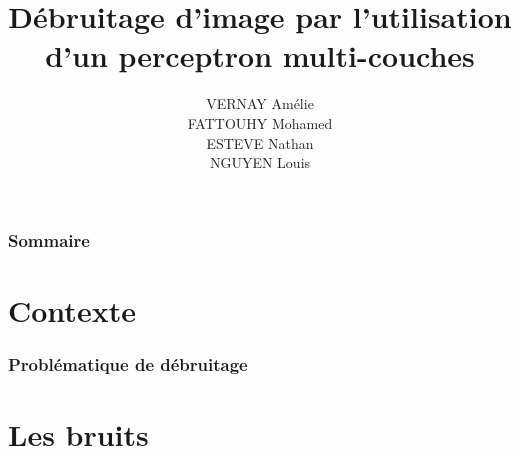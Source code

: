 \documentclass[8pt]{beamer}
\title{Débruitage d'image par l'utilisation d'un perceptron multi-couches}
\author{VERNAY Amélie \\ FATTOUHY Mohamed \\ ESTEVE Nathan \\ NGUYEN Louis}
\begin{document}
\begin{frame}
\titlepage
\end{frame}


\begin{frame}
\frametitle{Sommaire}
\tableofcontents
\end{frame}


\section{Contexte}

\begin{frame}
\frametitle{Problématique de débruitage}
\end{frame}


\section{Les bruits}

\begin{frame}
\end{frame}

\begin{frame}
\end{frame}


\begin{frame}
\end{frame}

\begin{frame}
\end{frame}

\begin{frame}
\end{frame}

\begin{frame}
\end{frame}


\begin{frame}
\end{frame}






\section*{}
\end{document}
